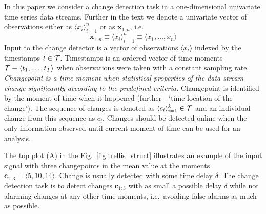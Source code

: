 In this paper we consider a change detection task in a one-dimensional univariate time series data streams.
Further in the text we denote a univariate vector of observations either as $\langle x_i \rangle_{i=1}^n$ or as $\pmb{x}_{1:n}$, i.e.
\[
\pmb{x}_{1:n} \equiv \langle x_i \rangle_{i=1}^n \equiv \langle x_1, \dots, x_n \rangle
\]
Input to the change detector is a vector of observations
$\langle x_t \rangle$ indexed by the timestamps $t \in \mathcal{T}$.
Timestamps is an ordered vector of time moments $\mathcal{T} \equiv \langle t_1, \dots, t_T \rangle$ when observations were taken with a constant sampling rate.
\textit{Changepoint is a time moment when statistical properties of the data stream change significantly according to the predefined criteria.}
Changepoint is identified by the moment of time when it happened (further - `time location of the change').
The sequence of changes is denoted as $\langle c_i \rangle_{i=1}^k \in \mathcal{T}$ and an individual change from this sequence as $c_i$.
Changes should be detected online when the only information observed until current moment of time can be used for an analysis.

The top plot (A) in the Fig.~\ref{fig:trellis_struct} illustrates an example of the input signal with three changepoints in the mean value at the moments $\pmb{c}_{1:3}=\langle 5, 10, 14 \rangle$.
Change is usually detected with some time delay $\delta$.
The change detection task is to detect changes $\pmb{c}_{1:3}$ with as small a possible delay $\delta$  while not alarming changes at any other time moments, i.e.\ avoiding false alarms as much as possible.
%

